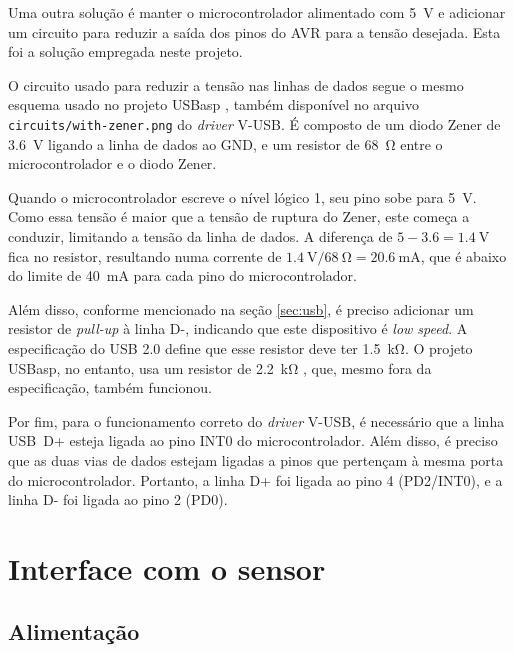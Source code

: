 \documentclass[brazil,pagestart=firstchapter]{abnt}
\newcommand*{\GND}{GND\xspace}
\newcommand*{\VUSB}{\mbox{V-USB}\xspace}
\begin{document}
Uma outra solução é manter o microcontrolador alimentado com \SI{5}{\volt} e
adicionar um circuito para reduzir a saída dos pinos do AVR para a tensão
desejada. Esta foi a solução empregada neste projeto.

O circuito usado para reduzir a tensão nas linhas de dados segue o mesmo
esquema usado no projeto USBasp \cite{USBasp}, também disponível no arquivo
\texttt{circuits/with-zener.png} do \textit{driver} \VUSB \cite{VUSBdriver}.
É composto de um diodo Zener de \SI{3.6}{\volt} ligando a linha de dados ao
\GND, e um resistor de \SI{68}{\ohm} entre o microcontrolador e o diodo
Zener.

Quando o microcontrolador escreve o nível lógico 1, seu pino sobe para
\SI{5}{\volt}. Como essa tensão é maior que a tensão de ruptura do Zener,
este começa a conduzir, limitando a tensão da linha de dados. A diferença de
$\num{5} - \num{3.6} = \SI{1.4}{\volt}$ fica no resistor, resultando numa
corrente de $\SI{1.4}{\volt} / \SI{68}{\ohm} = \SI{20.6}{\milli\ampere}$,
que é abaixo do limite de \SI{40}{\milli\ampere} para cada pino do
microcontrolador. \cite[p.~235]{ATmega8}

Além disso, conforme mencionado na seção \ref{sec:usb}, é preciso adicionar
um resistor de \textit{pull-up} à linha D-, indicando que este dispositivo
é \textit{low speed}. A especificação do USB 2.0 define que esse resistor
deve ter \SI{1.5}{\kilo\ohm}. \cite[p.~141,~180]{usb20} O projeto USBasp, no
entanto, usa um resistor de \SI{2.2}{\kilo\ohm} \cite{USBasp}, que, mesmo
fora da especificação, também funcionou.

Por fim, para o funcionamento correto do \textit{driver} \VUSB, é necessário
que a linha USB~D+ esteja ligada ao pino INT0 do microcontrolador. Além
disso, é preciso que as duas vias de dados estejam ligadas a pinos que
pertençam à mesma porta do microcontrolador.
\cite[usbconfig-prototype.h]{VUSBdriver} Portanto, a linha D+ foi ligada ao
pino 4 (PD2/INT0), e a linha D- foi ligada ao pino 2 (PD0).


\section{Interface com o sensor}
\label{sec:hardware_sensor}

\subsection{Alimentação}
\label{sub:hardware_sensor_alimentacao}
\end{document}
